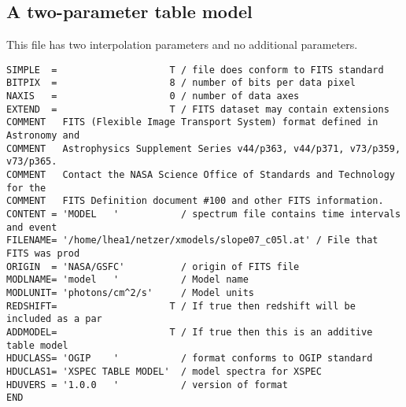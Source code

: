 \documentclass[11pt]{article}
\begin{document}
\subsection{A two-parameter table model}

This file has two interpolation parameters and no additional
parameters.

\begin{verbatim}
SIMPLE  =                    T / file does conform to FITS standard
BITPIX  =                    8 / number of bits per data pixel
NAXIS   =                    0 / number of data axes
EXTEND  =                    T / FITS dataset may contain extensions
COMMENT   FITS (Flexible Image Transport System) format defined in Astronomy and
COMMENT   Astrophysics Supplement Series v44/p363, v44/p371, v73/p359, v73/p365.
COMMENT   Contact the NASA Science Office of Standards and Technology for the
COMMENT   FITS Definition document #100 and other FITS information.
CONTENT = 'MODEL   '           / spectrum file contains time intervals and event
FILENAME= '/home/lhea1/netzer/xmodels/slope07_c05l.at' / File that FITS was prod
ORIGIN  = 'NASA/GSFC'          / origin of FITS file
MODLNAME= 'model   '           / Model name
MODLUNIT= 'photons/cm^2/s'     / Model units
REDSHIFT=                    T / If true then redshift will be included as a par
ADDMODEL=                    T / If true then this is an additive table model
HDUCLASS= 'OGIP    '           / format conforms to OGIP standard
HDUCLAS1= 'XSPEC TABLE MODEL'  / model spectra for XSPEC
HDUVERS = '1.0.0   '           / version of format
END
 

\end{verbatim}
\end{document}

